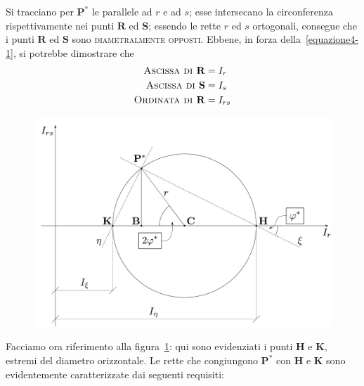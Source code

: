 \noindent Si tracciano per $\mathbf{P}^{*}$ le parallele ad $r$ e ad $s$; esse intersecano la circonferenza rispettivamente nei punti $\mathbf{R}$ ed $\mathbf{S}$; essendo le rette $r$ ed $s$ ortogonali, consegue che i punti $\mathbf{R}$ ed $\mathbf{S}$ sono \textsc{diametralmente opposti}. Ebbene, in forza della~\eqref{equazione4-1}, si potrebbe dimostrare che
\begin{align*}
\textup{\textsc{Ascissa di }}\mathbf{R} &= I_r \\
\textup{\textsc{Ascissa di }}\mathbf{S} &= I_s \\
\textup{\textsc{Ordinata di }}\mathbf{R} &= I_{rs} 
\end{align*}
\renewcommand{\thefigure}{5~-~3}
\begin{figure}[ht]
\centering
\includegraphics[width=\textwidth]{Immagini/Parte_5/Figura5_3/Figura5_3.pdf}
\caption{}
\label{figura5-3}
\end{figure}
Facciamo ora riferimento alla figura~\ref{figura5-3}: qui sono evidenziati i punti $\mathbf{H}$ e $\mathbf{K}$, estremi del diametro orizzontale. Le rette che congiungono $\mathbf{P}^{*}$ con $\mathbf{H}$ e $\mathbf{K}$ sono evidentemente caratterizzate dai seguenti requisiti:
